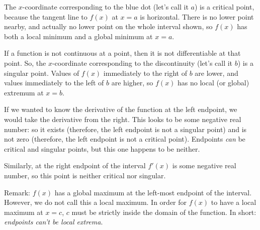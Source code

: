 \begin{solution}
\begin{center}\end{center}
The $x$-coordinate corresponding to the blue dot (let's call it $a$) is a critical point, because the tangent line to $f(x)$ at $x=a$ is horizontal. There is no lower point nearby, and actually no lower point on the whole interval shown, so $f(x)$ has both a local minimum and  a global minimum at $x=a$.

If a function is not continuous at a point, then it is not differentiable at that point. So, the $x$-coordinate  corresponding to the discontinuity (let's call it $b$) is a singular point. Values of $f(x)$ immediately to the right of $b$ are lower, and values immediately to the left of $b$ are higher, so $f(x)$ has no local (or global) extremum at $x=b$.

If we wanted to know the derivative of the function at the left endpoint, we would take the derivative from the right. This looks to be some negative real number: so it exists (therefore, the left endpoint is not a singular point) and is not zero (therefore, the left endpoint is not a critical point). Endpoints \emph{can} be critical and singular points, but this one happens to be neither.

Similarly, at the right endpoint of the interval $f'(x)$ is some negative real number, so this point is neither critical nor singular.

Remark: $f(x)$ has a global maximum at the left-most endpoint of the interval. However, we do not call this a local maximum. In order for $f(x)$ to have a local maximum at $x=c$, $c$ must be strictly inside the domain of the function. In short: \emph{endpoints can't be local extrema}.


\end{solution}


